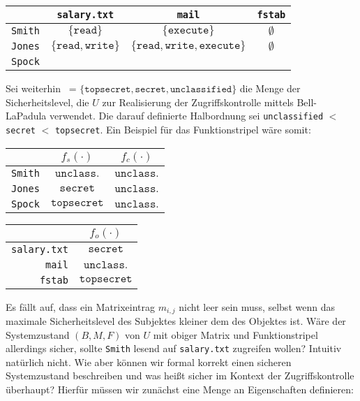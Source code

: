 \begin{center}
	\begin{tabular}{r||c|c|c}
        		& \texttt{salary.txt} & \texttt{mail} & \texttt{fstab} \\
      		\hline
      		\texttt{Smith} & \(\{\texttt{read}\}\) & \(\{\texttt{execute}\}\) & \(\emptyset\) \\
      		\texttt{Jones} & \(\{\texttt{read},\texttt{write}\}\) & \(\{\texttt{read},\texttt{write},\texttt{execute}\}\) & \(\emptyset\) \\
      		\texttt{Spock} & \calA    & \calA       & \calA
	\end{tabular}
\end{center}

Sei weiterhin \calL\ = \(\{\texttt{topsecret}, \texttt{secret}, \texttt{unclassified}\}\) die Menge der Sicherheitslevel, die
\(U\) zur Realisierung der Zugriffskontrolle mittels Bell-LaPadula verwendet. Die darauf definierte Halbordnung sei \texttt{unclassified} \(<\) \texttt{secret} \(<\) \texttt{topsecret}. Ein Beispiel für das Funktionstripel wäre somit:

\begin{center}
      \begin{tabular}{r||c|c}
       & \(f_s(\cdot)\) & \(f_c(\cdot)\) \\
      \hline
      \texttt{Smith} & \(\texttt{unclass.}\) & \(\texttt{unclass.}\) \\
      \texttt{Jones} & \(\texttt{secret}\) & \(\texttt{unclass.}\) \\
      \texttt{Spock} & \(\texttt{topsecret}\) & \(\texttt{unclass.}\)
      \end{tabular}
      \quad
      \begin{tabular}{r||c}
       & \(f_o(\cdot)\) \\
      \hline
      \texttt{salary.txt} & \(\texttt{secret}\) \\
      \texttt{mail} & \(\texttt{unclass.}\) \\
      \texttt{fstab} & \(\texttt{topsecret}\)
      \end{tabular}
\end{center}

Es fällt auf, dass ein Matrixeintrag \(m_{i, j}\) nicht leer sein muss, selbst wenn das maximale Sicherheitslevel des Subjektes
kleiner dem des Objektes ist. Wäre der Systemzustand \((B, M, F)\) von \(U\) mit obiger Matrix und Funktionstripel allerdings
sicher, sollte \texttt{Smith} lesend auf \texttt{salary.txt} zugreifen wollen? Intuitiv natürlich nicht. Wie aber können wir
formal korrekt einen sicheren Systemzustand beschreiben und was heißt sicher im Kontext der Zugriffskontrolle überhaupt? Hierfür müssen wir zunächst eine Menge an Eigenschaften definieren:

